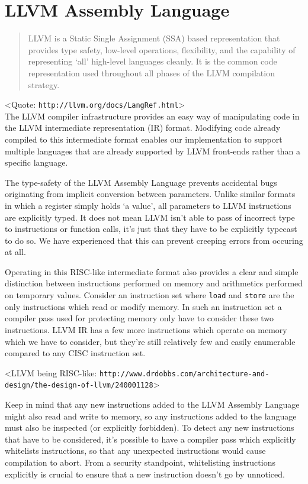 \chapter {LLVM Assembly Language}

\begin{quote}
LLVM is a Static Single Assignment (SSA) based representation that provides
type safety, low-level operations, flexibility, and the capability of
representing `all' high-level languages cleanly.
It is the common code representation used throughout all phases of the LLVM
compilation strategy.
\end{quote}

<Quote: \texttt{http://llvm.org/docs/LangRef.html}>\\

\noindent The LLVM compiler infrastructure provides an easy way of manipulating
code in the LLVM intermediate representation (IR) format.
Modifying code already compiled to this intermediate format enables our
implementation to support multiple languages that are already supported by LLVM
front-ends rather than a specific language.

The type-safety of the LLVM Assembly Language prevents accidental bugs
originating from implicit conversion between parameters.
Unlike similar formats in which a register simply holds `a value', all
parameters to LLVM instructions are explicitly typed.
It does not mean LLVM isn't able to pass of incorrect type to instructions or
function calls, it's just that they have to be explicitly typecast to do so.
We have experienced that this can prevent creeping errors from occuring at all.

Operating in this RISC-like intermediate format also provides a clear and
simple distinction between instructions performed on memory and arithmetics
performed on temporary values.
Consider an instruction set where \texttt{load} and \texttt{store} are the only
instructions which read or modify memory.
In such an instruction set a compiler pass used for protecting memory only have
to consider these two instructions.
LLVM IR has a few more instructions which operate on memory which we have to
consider, but they're still relatively few and easily enumerable compared to any
CISC instruction set.

<LLVM being RISC-like: \texttt{http://www.drdobbs.com/architecture-and-design/the-design-of-llvm/240001128}>

Keep in mind that any new instructions added to the LLVM Assembly Language might
also read and write to memory, so any instructions added to the language must
also be inspected (or explicitly forbidden).
To detect any new instructions that have to be considered, it's possible to have
a compiler pass which explicitly whitelists instructions, so that any unexpected
instructions would cause compilation to abort.
From a security standpoint, whitelisting instructions explicitly is crucial to
ensure that a new instruction doesn't go by unnoticed.

